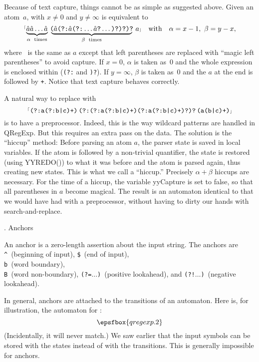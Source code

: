 Because of text capture, things cannot be as simple as suggested above. Given
an atom~$a$,  with $x \ne 0$ and $y \ne \infty$
is equivalent to
  $$\hbox{\rx{$\underbrace{\hbox{\haha\haha}\ldots\hbox{\haha\vphantom)}}
    _{\alpha\rm\ times}\,\,\underbrace{\!\hbox{(\haha(?:\haha(?:}\ldots\hbox{\haha?}
    \ldots\hbox{)?)?)?}\!}_{\beta\rm\ times}\,\,a$}} \quad \hbox{with}
    \quad \alpha = x - 1,\ \beta = y - x,$$
where \haha~is the same as $a$ except that left parentheses are replaced with
``magic left parentheses'' to avoid capture. If $x = 0$, $\alpha$ is taken
as~$0$ and the whole expression is enclosed within ({\tt (?:} and {\tt )?}). If
$y = \infty$, $\beta$ is taken as~$0$ and the $a$ at the end is followed by
{\tt +}. Notice that text capture behaves correctly.

A natural way to replace  with
  $$\hbox{{$^{\scriptscriptstyle\lceil}$\tt(?:a(?:b|c)+)$\,$(?:(?:a(?:b|c)+)(?:a(?:b|c)+)?)?$\,$(a(b|c)+)$\scriptscriptstyle\rfloor$}}$$
is to have a preprocessor. Indeed, this is the way wildcard patterns are
handled in {\sf QRegExp}. But this requires an extra pass on the data. The
solution is the ``hiccup'' method: Before parsing an atom $a$, the parser state
is saved in local variables. If the atom is followed by a non-trivial
quantifier, the state is restored (using {\sf YYREDO()}) to what it was before
and the atom is parsed again, thus creating new states. This is what we call a
``hiccup.'' Precisely $\alpha + \beta$ hiccups are necessary. For the time of a
hiccup, the variable {\sf yyCapture} is set to {\sf false}, so that all
parentheses in $a$ become magical. The result is an automaton identical to that
we would have had with a preprocessor, without having to dirty our hands with
search-and-replace.

. Anchors

An anchor is a zero-length assertion about the input string. The anchors are
{\tt\^}~(beginning of input), {\tt\$}~(end of input), {\tt\\b}~(word boundary),
{\tt\\B}~(word non-boundary), {\tt(?=}$\ldots${\tt)}~(positive lookahead), and
{\tt(?!}$\ldots${\tt)}~(negative lookahead).

In general, anchors are attached to the transitions of an automaton. Here is,
for illustration, the automaton for :
  $$\epsfbox{qregexp.2}$$
(Incidentally, it will never match.) We saw earlier that the input symbols can
be stored with the states instead of with the transitions. This is generally
impossible for anchors.

